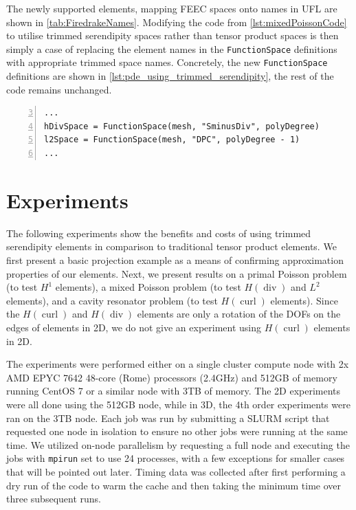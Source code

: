 \documentclass[format=acmsmall,screen,timestamp=false,a4paper]{acmart}
\DeclareMathOperator{\Div}{div}
\DeclareMathOperator{\curl}{curl}
\newcommand\josh[1]{\textbf{\textcolor[rgb]{0,.5,1}{[Josh: #1]}}}
\newcommand\lm[1]{\textbf{\textcolor[rgb]{1,0,0.5}{[Lawrence: #1]}}}
\newcommand{\hcurl}{\ensuremath{{H}(\curl ) } }
\newcommand{\hdiv}{\ensuremath{{H}(\Div ) } }
\begin{document}
The newly supported elements, mapping FEEC spaces onto names in UFL are shown in \cref{tab:FiredrakeNames}. Modifying the code from \cref{lst:mixedPoissonCode} to utilise trimmed serendipity spaces rather than tensor product spaces is then simply a case of replacing the element names in the \texttt{FunctionSpace} definitions with appropriate trimmed space names. Concretely, the new \texttt{FunctionSpace} definitions are shown in \cref{lst:pde_using_trimmed_serendipity}, the rest of the code remains unchanged.
\begin{lstlisting}[float=htbp,caption={Setting up Firedrake to use the trimmed serendipity elements in a mixed Poisson problem in 3D.}, label={lst:pde_using_trimmed_serendipity}, numbers=left, firstnumber=3, xleftmargin=20pt,  xrightmargin=20pt]
...
hDivSpace = FunctionSpace(mesh, "SminusDiv", polyDegree)
l2Space = FunctionSpace(mesh, "DPC", polyDegree - 1)
...
\end{lstlisting}





  \section{Experiments}
    
The following experiments show the benefits and costs of using trimmed serendipity elements in comparison to traditional tensor product elements.  We first present a basic projection example as a means of confirming approximation properties of our elements.  Next, we present results on a primal Poisson problem (to test $H^1$ elements), a mixed Poisson problem (to test \hdiv and $L^2$ elements), and a cavity resonator problem (to test \hcurl elements).  Since the \hcurl and \hdiv elements are only a rotation of the DOFs on the edges of elements in 2D, we do not give an experiment using \hcurl elements in 2D. 

The experiments were performed either on a single cluster compute node with 2x AMD EPYC 7642 48-core (Rome) processors (2.4GHz) and 512GB of memory running CentOS 7 or a similar node with 3TB of memory.  The 2D experiments were all done using the 512GB node, while in 3D, the 4th order experiments were ran on the 3TB node.  Each job was run by submitting a SLURM script that requested one node in isolation to ensure no other jobs were running at the same time.  We utilized on-node parallelism by requesting a full node and executing the jobs with \texttt{mpirun} set to use 24 processes, with a few exceptions for smaller cases that will be pointed out later.  Timing data was collected after first performing a dry run of the code to warm the cache and then taking the minimum time over three subsequent runs.  
\end{document}
